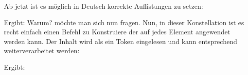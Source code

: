 \documentclass{article}
\begin{document}
\begin{bemerkung}
    Ab jetzt ist es möglich in Deutsch korrekte Auflistungen zu setzen:
    \begin{latex}
    \end{latex}
Ergibt: \newline
Warum? möchte man sich nun fragen. Nun, in dieser Konstellation ist es recht einfach einen Befehl zu Konstruiere der auf jedes Element angewendet werden kann. Der Inhalt wird als ein Token eingelesen und kann entsprechend weiterverarbeitet werden:
Ergibt: \def\tollercmd#1{%
\expandafter\Acronym{#1}%
}
\end{bemerkung}
\noindent{}
\noindent{}


\noindent{}
\end{document}
